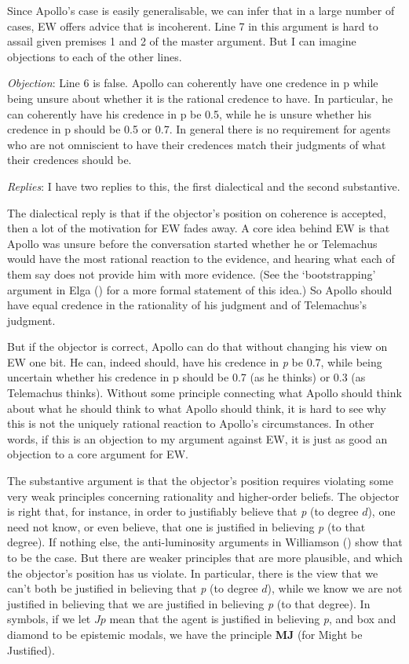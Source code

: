 \documentclass[
  10pt,
  letterpaper,
  DIV=11,
  numbers=noendperiod,
  twoside]{scrartcl}
\begin{document}
Since Apollo's case is easily generalisable, we can infer that in a
large number of cases, EW offers advice that is incoherent. Line 7 in
this argument is hard to assail given premises 1 and 2 of the master
argument. But I can imagine objections to each of the other lines.

\emph{Objection}: Line 6 is false. Apollo can coherently have one
credence in p while being unsure about whether it is the rational
credence to have. In particular, he can coherently have his credence in
p be 0.5, while he is unsure whether his credence in p should be 0.5 or
0.7. In general there is no requirement for agents who are not
omniscient to have their credences match their judgments of what their
credences should be.

\emph{Replies}: I have two replies to this, the first dialectical and
the second substantive.

The dialectical reply is that if the objector's position on coherence is
accepted, then a lot of the motivation for EW fades away. A core idea
behind EW is that Apollo was unsure before the conversation started
whether he or Telemachus would have the most rational reaction to the
evidence, and hearing what each of them say does not provide him with
more evidence. (See the `bootstrapping' argument in Elga
() for a more formal statement of
this idea.) So Apollo should have equal credence in the rationality of
his judgment and of Telemachus's judgment.

But if the objector is correct, Apollo can do that without changing his
view on EW one bit. He can, indeed should, have his credence in \emph{p}
be 0.7, while being uncertain whether his credence in p should be 0.7
(as he thinks) or 0.3 (as Telemachus thinks). Without some principle
connecting what Apollo should think about what he should think to what
Apollo should think, it is hard to see why this is not the uniquely
rational reaction to Apollo's circumstances. In other words, if this is
an objection to my argument against EW, it is just as good an objection
to a core argument for EW.

The substantive argument is that the objector's position requires
violating some very weak principles concerning rationality and
higher-order beliefs. The objector is right that, for instance, in order
to justifiably believe that \emph{p} (to degree \(d\)), one need not
know, or even believe, that one is justified in believing \emph{p} (to
that degree). If nothing else, the anti-luminosity arguments in
Williamson () show that to be
the case. But there are weaker principles that are more plausible, and
which the objector's position has us violate. In particular, there is
the view that we can't both be justified in believing that \emph{p} (to
degree \(d\)), while we know we are not justified in believing that we
are justified in believing \emph{p} (to that degree). In symbols, if we
let \(Jp\) mean that the agent is justified in believing \emph{p}, and
box and diamond to be epistemic modals, we have the principle
\textbf{MJ} (for Might be Justified).
\end{document}
